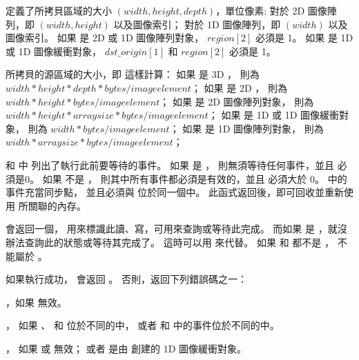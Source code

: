  定義了所拷貝區域的大小 $(width, height, depth)$，單位像素;
對於 2D 圖像陣列，即 $(width, height)$ 以及圖像索引；
對於 1D 圖像陣列，即 $(width)$ 以及圖像索引。
如果  是 2D  或 1D 圖像陣列對象， $region[2]$ 必須是 1。
如果  是 1D 或 1D 圖像緩衝對象，
$dst\_origin[1]$ 和 $region[2]$ 必須是 1。

所拷貝的源區域的大小，即  這樣計算：
如果  是 3D ，
則為 $width * height * depth * bytes/image element$；
如果  是 2D ，
則為 $width * height * bytes/image element$；
如果  是 2D 圖像陣列對象，
則為 $width * height * arraysize * bytes/image element$；
如果  是 1D 或 1D 圖像緩衝對象，
則為 $width * bytes/image element$；
如果  是 1D 圖像陣列對象，
則為 $width * arraysize * bytes/image element$；

 和  中
列出了執行此前要等待的事件。
如果  是 ，
則無須等待任何事件，並且  必須是0。
如果  不是 ，
則其中所有事件都必須是有效的，並且  必須大於 0。
 中的事件充當同步點，
並且必須與  位於同一個中。
此函式返回後，即可回收並重新使用  所關聯的內存。

 會返回一個，
用來標識此讀、寫，可用來查詢或等待此完成。
而如果  是 ，就沒辦法查詢此的狀態或等待其完成了。
這時可以用  來代替。
如果  和  都不是 ，
 不能屬於 。

如果執行成功，  會返回 。
否則，返回下列錯誤碼之一：
\startigBase
\item {}，如果  無效。

\item {}，
如果 、  和  位於不同的中，
或者  和  中的事件位於不同的中。

\item {}，
如果  或  無效；
或者  是由  創建的 1D 圖像緩衝對象。

